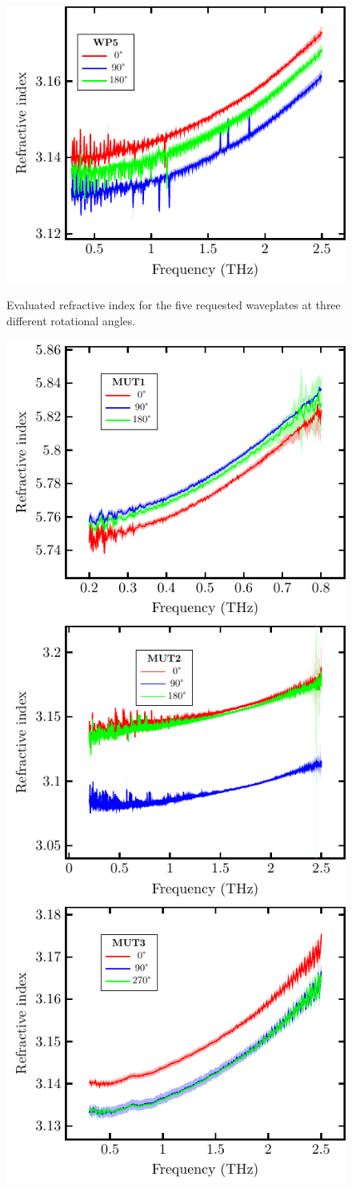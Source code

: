 \begin{figure}[H]
\subcaptionbox{\label{fig:ceramic_WP5}}
    {\includegraphics[width=0.45\linewidth]{images/appendix/plots/real/WP5.pdf}}
\caption{Evaluated refractive index for the five requested waveplates at three different rotational angles.}
\label{fig:ceramic_WPs}
\end{figure}

\begin{figure}[H]
\centering
\subcaptionbox{\label{fig:ceramic_MUT1}}
    {\hspace*{-2em}\includegraphics[width=0.45\linewidth]{images/appendix/plots/real/MUT1.pdf}}
\qquad
\subcaptionbox{\label{fig:ceramic_MUT2}}
    {\hspace*{-2em}\includegraphics[width=0.45\linewidth]{images/appendix/plots/real/MUT2.pdf}}
\subcaptionbox{\label{fig:ceramic_MUT3}}
    {\hspace*{-2em}\includegraphics[width=0.45\linewidth]{images/appendix/plots/real/MUT3.pdf}}

\end{figure}
